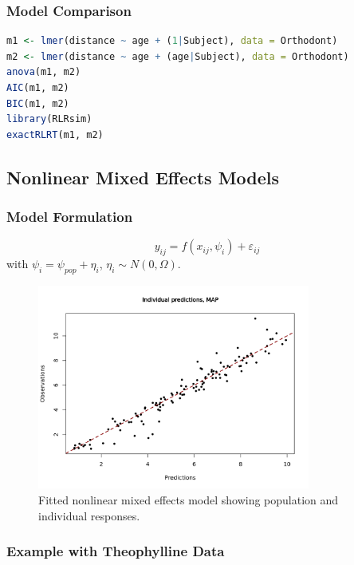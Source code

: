 \documentclass[11pt,a4paper]{article}
\begin{document}
\subsubsection{Model Comparison}
\begin{lstlisting}[language=R]
m1 <- lmer(distance ~ age + (1|Subject), data = Orthodont)
m2 <- lmer(distance ~ age + (age|Subject), data = Orthodont)
anova(m1, m2)
AIC(m1, m2)
BIC(m1, m2)
library(RLRsim)
exactRLRT(m1, m2)
\end{lstlisting}

\subsection{Nonlinear Mixed Effects Models}

\subsubsection{Model Formulation}
\begin{equation}
y_{ij} = f(x_{ij}, \psi_i) + \varepsilon_{ij}
\end{equation}
with $\psi_i = \psi_{pop} + \eta_i$, $\eta_i \sim N(0, \Omega)$.

\begin{figure}[htb]
    \centering
    \includegraphics[width=0.8\textwidth]{nlme-fit}
    \caption{Fitted nonlinear mixed effects model showing population and individual responses.}
\end{figure}

\subsubsection{Example with Theophylline Data}
\end{document}
